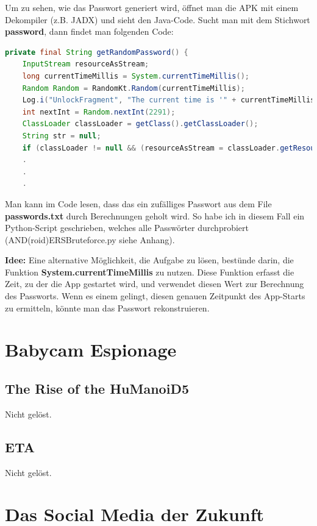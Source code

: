\documentclass[12pt, a4paper, titlepage, oneside]{scrartcl}
\begin{document}
    \noindent Um zu sehen, wie das Passwort generiert wird, öffnet man die APK mit einem Dekompiler (z.B. JADX) und sieht den Java-Code. Sucht man mit dem Stichwort \textbf{password}, dann findet man folgenden Code:
    \begin{lstlisting}[language=java]
    private final String getRandomPassword() {
    InputStream resourceAsStream;
    long currentTimeMillis = System.currentTimeMillis();
    Random Random = RandomKt.Random(currentTimeMillis);
    Log.i("UnlockFragment", "The current time is '" + currentTimeMillis + "'");
    int nextInt = Random.nextInt(2291);
    ClassLoader classLoader = getClass().getClassLoader();
    String str = null;
    if (classLoader != null && (resourceAsStream = classLoader.getResourceAsStream("passwords.txt")) != null)
    .
    .
    .
    \end{lstlisting}
    Man kann im Code lesen, dass das ein zufälliges Passwort aus dem File \textbf{passwords.txt} durch Berechnungen geholt wird. So habe ich in diesem Fall ein Python-Script geschrieben, welches alle Passwörter durchprobiert (AND(roid)ERSBruteforce.py siehe Anhang). \newline
    
    \noindent\textbf{Idee:}
    Eine alternative Möglichkeit, die Aufgabe zu lösen, bestünde darin, die Funktion \textbf{System.currentTimeMillis} zu nutzen. Diese Funktion erfasst die Zeit, zu der die App gestartet wird, und verwendet diesen Wert zur Berechnung des Passworts. Wenn es einem gelingt, diesen genauen Zeitpunkt des App-Starts zu ermitteln, könnte man das Passwort rekonstruieren.

	\section{Babycam Espionage}

	\subsection{The Rise of the HuManoiD5}
	Nicht gelöst.

	\subsection{ETA}
	Nicht gelöst.

	\section{Das Social Media der Zukunft}
\end{document}
